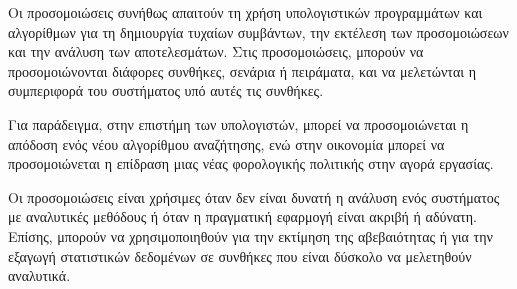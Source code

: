 \documentclass[11pt]{article}
\makeatletter
\newcommand{\boxspacing}{\kern\kvtcb@left@rule\kern\kvtcb@boxsep}
\newcommand{\prompt}[4]{
        {\ttfamily\llap{{\color{#2}[#3]:\hspace{3pt}#4}}\vspace{-\baselineskip}}
    }
\makeatother
\begin{document}
Οι προσομοιώσεις συνήθως απαιτούν τη χρήση υπολογιστικών προγραμμάτων
και αλγορίθμων για τη δημιουργία τυχαίων συμβάντων, την εκτέλεση των
προσομοιώσεων και την ανάλυση των αποτελεσμάτων. Στις προσομοιώσεις,
μπορούν να προσομοιώνονται διάφορες συνθήκες, σενάρια ή πειράματα, και
να μελετώνται η συμπεριφορά του συστήματος υπό αυτές τις συνθήκες.

Για παράδειγμα, στην επιστήμη των υπολογιστών, μπορεί να προσομοιώνεται
η απόδοση ενός νέου αλγορίθμου αναζήτησης, ενώ στην οικονομία μπορεί να
προσομοιώνεται η επίδραση μιας νέας φορολογικής πολιτικής στην αγορά
εργασίας.

Οι προσομοιώσεις είναι χρήσιμες όταν δεν είναι δυνατή η ανάλυση ενός
συστήματος με αναλυτικές μεθόδους ή όταν η πραγματική εφαρμογή είναι
ακριβή ή αδύνατη. Επίσης, μπορούν να χρησιμοποιηθούν για την εκτίμηση
της αβεβαιότητας ή για την εξαγωγή στατιστικών δεδομένων σε συνθήκες που
είναι δύσκολο να μελετηθούν αναλυτικά.

    \begin{tcolorbox}[breakable, size=fbox, boxrule=1pt, pad at break*=1mm,colback=cellbackground, colframe=cellborder]
\prompt{In}{incolor}{ }{\boxspacing}
\begin{Verbatim}[commandchars=\\\{\}]

\end{Verbatim}
\end{tcolorbox}


    
    
    
\end{document}
